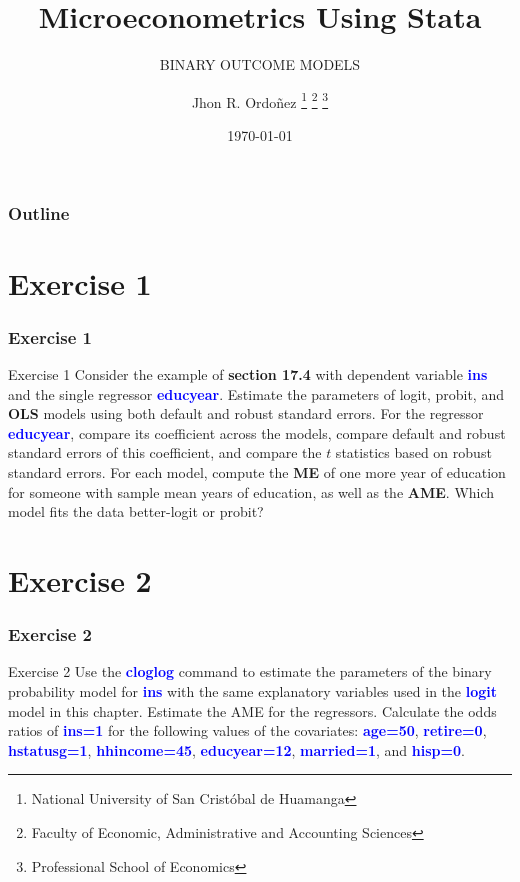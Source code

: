 \documentclass[11pt, aspectratio=169]{beamer}
\title{Microeconometrics Using Stata}
\subtitle{BINARY OUTCOME MODELS}
\author{
		Jhon R. Ordoñez
		\footnote{\label{1} National University of San Cristóbal de Huamanga}
		\footnote{\label{2} Faculty of Economic, Administrative and Accounting Sciences}
		\footnote{\label{3} Professional School of Economics}
	}
\date{\today}
\begin{document}
	\begin{frame}
		\maketitle
	\end{frame}
	\begin{frame}[t]
		\frametitle{Outline}
		\tableofcontents
	\end{frame}
	\section{Exercise 1}
		\begin{frame}
			\frametitle{Exercise 1}
				\begin{block}{Exercise 1}
					Consider the example of \textcolor{red!50}{\textbf{section 17.4}} with dependent variable \textcolor{blue}{\textbf{ins}} and
					the single regressor \textcolor{blue}{\textbf{educyear}}. Estimate the parameters of logit, probit,
					and \textbf{OLS} models using both default and robust standard errors. For the
					regressor \textcolor{blue}{\textbf{educyear}}, compare its coefficient across the models,
					compare default and robust standard errors of this coefficient, and
					compare the $t$ statistics based on robust standard errors. For each
					model, compute the \textbf{ME} of one more year of education for someone
					with sample mean years of education, as well as the \textbf{AME}. Which
					model fits the data better-logit or probit?	
				\end{block}
		\end{frame}
	\section{Exercise 2}
		\begin{frame}
			\frametitle{Exercise 2}
			\begin{block}{Exercise 2}
				Use the \textcolor{blue}{\textbf{cloglog}} command to estimate the parameters of the binary
				probability model for \textcolor{blue}{\textbf{ins}} with the same explanatory variables used in
				the \textcolor{blue}{\textbf{logit}} model in this chapter. Estimate the AME for the regressors.
				Calculate the odds ratios of \textcolor{blue}{\textbf{ins=1}} for the following values of the
				covariates: \textcolor{blue}{\textbf{age=50}}, \textcolor{blue}{\textbf{retire=0}}, \textcolor{blue}{\textbf{hstatusg=1}}, \textcolor{blue}{\textbf{hhincome=45}},
				\textcolor{blue}{\textbf{educyear=12}}, \textcolor{blue}{\textbf{married=1}}, and \textcolor{blue}{\textbf{hisp=0}}.
			\end{block}
		\end{frame}
\end{document}
